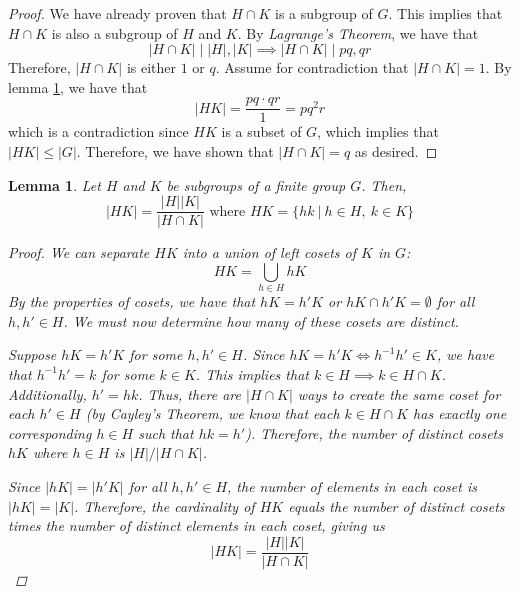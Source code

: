 \documentclass[12pt,reqno]{article}
\theoremstyle{plain}
\newtheorem{lemma}{Lemma}
\theoremstyle{definition}
\begin{document}
\begin{proof}
    We have already proven that \(H\cap K\) is a subgroup of \(G\). This implies that \(H\cap K\) is also a
    subgroup of \(H\) and \(K\). By \emph{Lagrange's Theorem}, we have that 
    \[|H\cap K|\mid |H|,|K|\implies |H\cap K|\mid pq,qr\]
    Therefore, \(|H\cap K|\) is either \(1\) or \(q\). Assume for contradiction that
    \(|H\cap K|=1\). By lemma \ref{lem:HK}, we have that
    \[|HK|=\frac{pq\cdot qr}{1}=pq^2r\]
    which is a contradiction since \(HK\) is a subset of \(G\), which implies that
    \(|HK|\leq|G|\). Therefore, we have shown that \(|H\cap K|=q\) as desired.
\end{proof}
\bigskip
\begin{lemma}
    \label{lem:HK}
    Let \(H\) and \(K\) be subgroups of a finite group \(G\). Then,
    \[|HK|=\frac{|H||K|}{|H\cap K|} \text{ where } HK=\{hk\ |\ h\in H,\ k\in K\}\]
    
    \begin{proof}
        We can separate \(HK\) into a union of left cosets of \(K\) in \(G\):
        \[HK=\bigcup_{h\in H} hK\]
        By the properties of cosets, we have that \(hK=h'K\) or \(hK\cap h'K=\emptyset\) for all
        \(h,h'\in H\). We must now determine how many of these cosets are distinct.
        
        Suppose \(hK=h'K\) for some \(h,h'\in H\). Since \(hK=h'K \Leftrightarrow h^{-1}h'\in K\), we have that
        \(h^{-1}h'=k\) for some \(k\in K\). This implies that \(k\in H\implies k\in H\cap K\).
        Additionally, \(h'=hk\). Thus, there are \(|H\cap K|\) ways to create the same coset for each \(h'\in H\)
        (by \emph{Cayley's Theorem}, we know that each \(k\in H\cap K\) has exactly one corresponding \(h\in H\) such that
        \(hk=h'\)). Therefore, the number of distinct cosets \(hK\) where \(h\in H\) is \(|H|/|H\cap K|\).

        Since \(|hK|=|h'K|\) for all \(h,h'\in H\), the number of elements in each coset is \(|hK|=|K|\). Therefore,
        the cardinality of \(HK\) equals the number of distinct cosets times the number of distinct elements in each coset, giving us
        \[|HK|=\frac{|H||K|}{|H\cap K|}\]
    \end{proof}
\end{lemma}

\newpage
    
\end{document}
